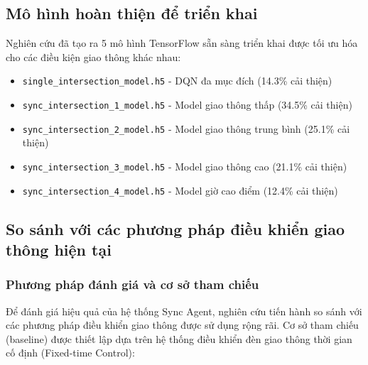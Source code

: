 
\subsection{Mô hình hoàn thiện để triển khai}

Nghiên cứu đã tạo ra 5 mô hình TensorFlow sẵn sàng triển khai được tối ưu hóa cho các điều kiện giao thông khác nhau:

\begin{itemize}
    \item \texttt{single\_intersection\_model.h5} - DQN đa mục đích (14.3\% cải thiện)
    \item \texttt{sync\_intersection\_1\_model.h5} - Model giao thông thấp (34.5\% cải thiện)
    \item \texttt{sync\_intersection\_2\_model.h5} - Model giao thông trung bình (25.1\% cải thiện)  
    \item \texttt{sync\_intersection\_3\_model.h5} - Model giao thông cao (21.1\% cải thiện)
    \item \texttt{sync\_intersection\_4\_model.h5} - Model giờ cao điểm (12.4\% cải thiện)
\end{itemize}

\subsection{So sánh với các phương pháp điều khiển giao thông hiện tại}

\subsubsection{Phương pháp đánh giá và cơ sở tham chiếu}

Để đánh giá hiệu quả của hệ thống Sync Agent, nghiên cứu tiến hành so sánh với các phương pháp điều khiển giao thông được sử dụng rộng rãi. Cơ sở tham chiếu (baseline) được thiết lập dựa trên hệ thống điều khiển đèn giao thông thời gian cố định (Fixed-time Control):

